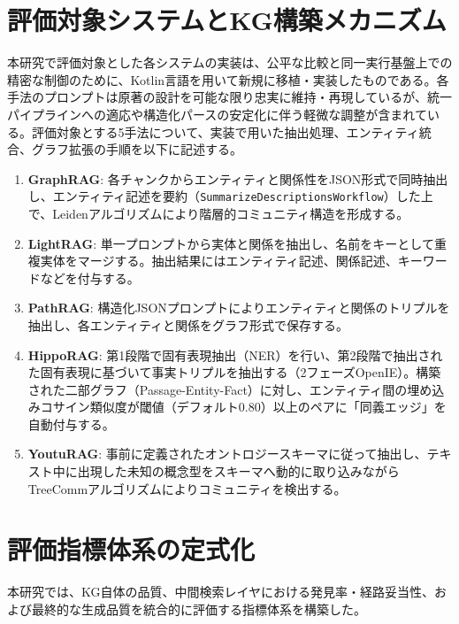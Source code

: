 \documentclass[a4j,dvipdfmx]{jsarticle}
\begin{document}
\section{評価対象システムとKG構築メカニズム}

本研究で評価対象とした各システムの実装は、公平な比較と同一実行基盤上での精密な制御のために、Kotlin言語を用いて新規に移植・実装したものである。各手法のプロンプトは原著の設計を可能な限り忠実に維持・再現しているが、統一パイプラインへの適応や構造化パースの安定化に伴う軽微な調整が含まれている。評価対象とする5手法について、実装で用いた抽出処理、エンティティ統合、グラフ拡張の手順を以下に記述する。
\begin{enumerate}
    \item \textbf{GraphRAG}: 各チャンクからエンティティと関係性をJSON形式で同時抽出し、エンティティ記述を要約（\texttt{SummarizeDescriptionsWorkflow}）した上で、Leidenアルゴリズムにより階層的コミュニティ構造を形成する。
    \item \textbf{LightRAG}: 単一プロンプトから実体と関係を抽出し、名前をキーとして重複実体をマージする。抽出結果にはエンティティ記述、関係記述、キーワードなどを付与する。
    \item \textbf{PathRAG}: 構造化JSONプロンプトによりエンティティと関係のトリプルを抽出し、各エンティティと関係をグラフ形式で保存する。
    \item \textbf{HippoRAG}: 第1段階で固有表現抽出（NER）を行い、第2段階で抽出された固有表現に基づいて事実トリプルを抽出する（2フェーズOpenIE）。構築された二部グラフ（Passage-Entity-Fact）に対し、エンティティ間の埋め込みコサイン類似度が閾値（デフォルト0.80）以上のペアに「同義エッジ」を自動付与する。
    \item \textbf{YoutuRAG}: 事前に定義されたオントロジースキーマに従って抽出し、テキスト中に出現した未知の概念型をスキーマへ動的に取り込みながらTreeCommアルゴリズムによりコミュニティを検出する。
\end{enumerate}

\section{評価指標体系の定式化}

本研究では、KG自体の品質、中間検索レイヤにおける発見率・経路妥当性、および最終的な生成品質を統合的に評価する指標体系を構築した。
\end{document}
